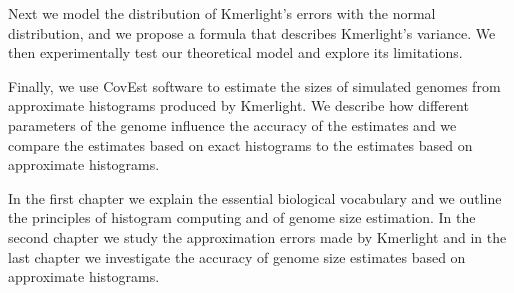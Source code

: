 Next we model the distribution of Kmerlight's errors with the normal distribution,
and we propose a formula that describes Kmerlight's variance. We then experimentally test
our theoretical model and explore its limitations.

Finally, we use CovEst software \cite{Hozza2015} to estimate the sizes of simulated genomes
from approximate histograms produced by Kmerlight. We describe how different parameters of
the genome influence the accuracy of the estimates and we compare the estimates
based on exact histograms to the estimates based on approximate histograms.

\medskip

In the first chapter we explain the essential biological vocabulary and
we outline the principles of histogram computing and of genome size estimation.
In the second chapter we study the approximation errors made by Kmerlight
and in the last chapter we investigate the accuracy of genome size estimates
based on approximate histograms.
